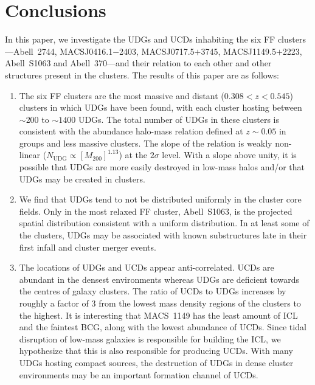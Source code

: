 \documentclass[iop,tighten,twocolumn,apj,floatfix]{emulateapj}
\begin{document}
\section{Conclusions}

In this paper, we investigate the UDGs and UCDs inhabiting the six FF
clusters---Abell~2744, MACSJ0416.1$-$2403, MACSJ0717.5$+$3745,
MACSJ1149.5$+$2223, Abell~S1063 and Abell~370---and their relation to each
other and other structures present in the clusters.
The results of this paper are as follows:
\begin{enumerate}
    \item The six FF clusters are the most massive and distant
        ($0.308 < z < 0.545$) clusters in which UDGs have been found,
        with each cluster hosting between ${\sim}200$ to ${\sim}1400$ UDGs.
        The total number of UDGs in these clusters is
        consistent with the abundance halo-mass relation defined at $z \sim
        0.05$ in groups and less massive clusters.
        The slope of the relation is weakly non-linear ($N_\mathrm{UDG}
        \propto [M_{200}]^{1.13}$) at the $2\sigma$ level.
        With a slope above unity, it is possible that UDGs are more easily
        destroyed in low-mass halos and/or that UDGs may be created in
        clusters.

    \item We find that UDGs tend to not be distributed uniformly in the
        cluster core fields.
        Only in the most relaxed FF cluster, Abell~S1063, is the projected
        spatial distribution consistent with a uniform distribution.
        In at least some of the clusters, UDGs may be associated with known
        substructures late in their first infall and cluster
        merger events.

    \item The locations of UDGs and UCDs appear anti-correlated.
        UCDs are abundant in the densest environments whereas UDGs are
        deficient towards the centres of galaxy clusters.
        The ratio of UCDs to UDGs increases by roughly a factor of 3 from the
        lowest mass density regions of the clusters to the highest.
        It is interesting that MACS~1149 has the least amount of ICL and the faintest
        BCG, along with the lowest abundance of UCDs.
        Since tidal disruption of low-mass galaxies is responsible for building
        the ICL, we hypothesize that this is also responsible for producing
        UCDs.
        With many UDGs hosting compact sources, the destruction of UDGs in
        dense cluster environments may be an important formation channel of
        UCDs.
\end{enumerate}
\end{document}
